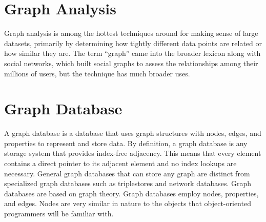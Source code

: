 \newpage
\section{Graph Analysis}
Graph analysis is among the hottest techniques around for making sense of large datasets, primarily by determining how tightly different data points are related or how similar they are. The term “graph” came into the broader lexicon along with social networks, which built social graphs to assess the relationships among their millions of users, but the technique has much broader uses.
\section{Graph Database}

A graph database is a database that uses graph structures with nodes, edges, and properties to represent and store data. By definition, a graph database is any storage system that provides index-free adjacency. This means that every element contains a direct pointer to its adjacent element and no index lookups are necessary. General graph databases that can store any graph are distinct from specialized graph databases such as triplestores and network databases.
Graph databases are based on graph theory. Graph databases employ nodes, properties, and edges. Nodes are very similar in nature to the objects that object-oriented programmers will be familiar with.


